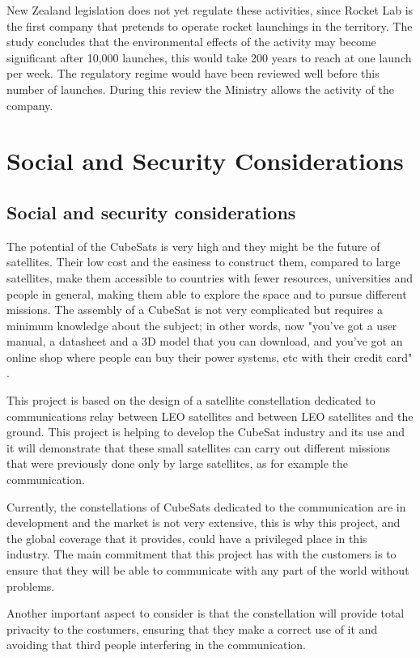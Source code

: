 New Zealand legislation does not yet regulate these activities, since Rocket Lab is the first company that pretends to operate rocket launchings in the territory. The study concludes that the environmental effects of the activity may become significant after 10,000 launches, this would take 200 years to reach at one launch per week. The regulatory regime would have been reviewed well before this number of launches. During this review the Ministry allows the activity of the company.

\chapter{Social and Security Considerations}

\section{Social and security considerations}
The potential of the CubeSats is very high and they might be the future of satellites. Their low cost and the easiness to construct them, compared to large satellites, make them accessible to countries with fewer resources, universities and people in general, making them able to explore the space and to pursue different missions. The assembly of a CubeSat is not very complicated but requires a minimum knowledge about the subject; in other words, now "you've got a user manual, a datasheet and a 3D model that you can download, and you've got an online shop where people can buy their power systems, etc with their credit card" \cite{CraigClark}. 

This project is based on the design of a satellite constellation dedicated to communications relay between LEO satellites and between LEO satellites and the ground. This project is helping to develop the CubeSat industry and its use and it will demonstrate that these small satellites can carry out different missions that were previously done only by large satellites, as for example the communication.

Currently, the constellations of CubeSats dedicated to the communication are in development and the market is not very extensive, this is why this project, and the global coverage that it provides, could have a privileged place in this industry. The main commitment that this project has with the customers is to ensure that they will be able to communicate with any part of the world without problems. 

Another important aspect to consider is that the constellation will provide total privacity  to the costumers, ensuring that they make a correct use of it and avoiding that third people interfering in the communication.

